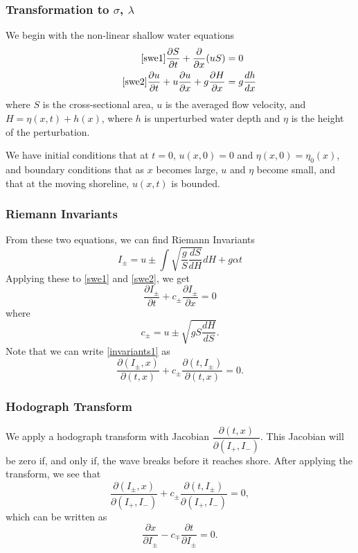 	\begin{frame}
		\frametitle{Transformation to $\sigma$, $\lambda$}
		We begin with the non-linear shallow water equations
		\begin{align} 
			\tag*{\eqref{swe1}}
			\frac{\partial S}{\partial t} + \frac{\partial}{\partial x} (uS) &= 0  \\
			\tag*{\eqref{swe2}}
			\frac{\partial u}{\partial t} + u \frac{\partial u}{\partial x} + g \frac{\partial H}{\partial x} &= g \frac{dh}{dx}
		\end{align}
		where $S$ is the cross-sectional area, $u$ is the averaged flow velocity, and $H = \eta(x,t) + h(x)$, where $h$ is unperturbed water depth and $\eta$ is the height of the perturbation.
		
		We have initial conditions that at $t=0$, $u(x,0) = 0$ and $\eta(x,0) = \eta_0(x)$, and boundary conditions that as $x$ becomes large, $u$ and $\eta$ become small, and that at the moving shoreline, $u(x,t)$ is bounded.
		
	\end{frame}


\begin{frame}
\frametitle{Riemann Invariants}
From these two equations, we can find Riemann Invariants
\[
I_\pm = u \pm \int \sqrt{\frac{g}{S}\frac{dS}{dH}} dH + g \alpha t
\]
Applying these to \eqref{swe1} and \eqref{swe2}, we get
\begin{equation}\label{invariants1}
\frac{\partial I_\pm}{\partial t} + c_{\pm} \frac{\partial I_\pm}{\partial x} = 0
\end{equation}
where
\[
c_\pm = u \pm \sqrt{g S \frac{dH}{dS}}.
\]
Note that we can write \eqref{invariants1} as
\[
\frac{\partial (I_\pm, x)}{\partial (t,x)} + c_\pm \frac{\partial(t, I_\pm)}{\partial (t,x)} = 0.
\]
\end{frame}

\begin{frame}
\frametitle{Hodograph Transform}
We apply a hodograph transform with Jacobian $\dfrac{\partial (t,x)}{\partial(I_+, I_-)}$. This Jacobian will be zero if, and only if, the wave breaks before it reaches shore. After applying the transform, we see that
\[
\frac{\partial(I_\pm,x)}{\partial(I_+,I_-)} + c_\pm \frac{\partial (t, I_\pm)}{\partial(I_+,I_-)} = 0,
\]
which can be written as
\begin{equation}\label{hodograph}
\frac{\partial x}{\partial I_\pm} - c_\mp \frac{\partial t}{\partial I_\pm} = 0.
\end{equation}
\end{frame}

